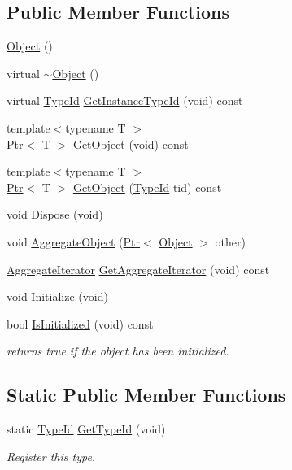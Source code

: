 \subsection*{Public Member Functions}
\begin{DoxyCompactItemize}
\item 
\hyperlink{classns3_1_1Object_a40860402e64d8008fb42329df7097cdb}{Object} ()
\item 
virtual \hyperlink{classns3_1_1Object_ae8f5483f459e46687bd01e6f9977afd3}{$\sim$\+Object} ()
\item 
virtual \hyperlink{classns3_1_1TypeId}{Type\+Id} \hyperlink{classns3_1_1Object_a51e5994fa4b6eae32d719ad69f8fcbf5}{Get\+Instance\+Type\+Id} (void) const 
\item 
{\footnotesize template$<$typename T $>$ }\\\hyperlink{classns3_1_1Ptr}{Ptr}$<$ T $>$ \hyperlink{classns3_1_1Object_a13e18c00017096c8381eb651d5bd0783}{Get\+Object} (void) const 
\item 
{\footnotesize template$<$typename T $>$ }\\\hyperlink{classns3_1_1Ptr}{Ptr}$<$ T $>$ \hyperlink{classns3_1_1Object_a2c31e547787afefeca281fad8ba94f11}{Get\+Object} (\hyperlink{classns3_1_1TypeId}{Type\+Id} tid) const 
\item 
void \hyperlink{classns3_1_1Object_aa90ae598863f6c251cdab3c3722afdaf}{Dispose} (void)
\item 
void \hyperlink{classns3_1_1Object_a79dd435d300f3deca814553f561a2922}{Aggregate\+Object} (\hyperlink{classns3_1_1Ptr}{Ptr}$<$ \hyperlink{classns3_1_1Object}{Object} $>$ other)
\item 
\hyperlink{classns3_1_1Object_1_1AggregateIterator}{Aggregate\+Iterator} \hyperlink{classns3_1_1Object_acdd85719e950c54a9a3ccf24f3816d5b}{Get\+Aggregate\+Iterator} (void) const 
\item 
void \hyperlink{classns3_1_1Object_af4411cb29971772fcd09203474a95078}{Initialize} (void)
\item 
bool \hyperlink{classns3_1_1Object_a3db2ecf857f51c1ad66c5103ac679e2d}{Is\+Initialized} (void) const 
\begin{DoxyCompactList}\small\item\em returns true if the object has been initialized. \end{DoxyCompactList}\end{DoxyCompactItemize}
\subsection*{Static Public Member Functions}
\begin{DoxyCompactItemize}
\item 
static \hyperlink{classns3_1_1TypeId}{Type\+Id} \hyperlink{classns3_1_1Object_a1d040243983ab74ec923bde26d7cb7e7}{Get\+Type\+Id} (void)
\begin{DoxyCompactList}\small\item\em Register this type. \end{DoxyCompactList}\end{DoxyCompactItemize}
